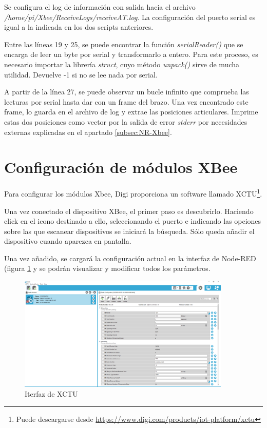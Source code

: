 Se configura el log de información con salida hacia el archivo \textit{/home/pi/Xbee/ReceiveLogs/receiveAT.log}. La configuración del puerto serial es igual a la indicada en los dos scripts anteriores.

Entre las líneas 19 y 25, se puede encontrar la función \textit{serialReader()} que se encarga de leer un byte por serial y transformarlo a entero. Para este proceso, es necesario importar la librería \textit{struct}, cuyo método \textit{unpack()} sirve de mucha utilidad. Devuelve -1 si no se lee nada por serial.

A partir de la línea 27, se puede observar un bucle infinito que comprueba las lecturas por serial hasta dar con un frame del brazo. Una vez encontrado este frame, lo guarda en el archivo de log y extrae las posiciones articulares. Imprime estas dos posiciones como vector por la salida de error \textit{stderr} por necesidades externas explicadas en el apartado \ref{subsec:NR-Xbee}.

\section{Configuración de módulos XBee}\label{subsubsec:xctu}

Para configurar los módulos Xbee, Digi proporciona un software llamado XCTU\footnote{Puede descargarse desde \url{https://www.digi.com/products/iot-platform/xctu}}. 

Una vez conectado el dispositivo XBee, el primer paso es descubrirlo. Haciendo click en el icono destinado a ello, seleccionando el puerto e indicando las opciones sobre las que escanear dispositivos se iniciará la búsqueda. Sólo queda añadir el dispositivo cuando aparezca en pantalla.

Una vez añadido, se cargará la configuración actual en la interfaz de Node-RED (figura \ref{fig:XCTU} y  se podrán visualizar y modificar todos los parámetros.

\begin{figure}[tb]
\centering
\includegraphics[width=0.9\textwidth, frame]{figuras/interfazXCTU.png}
\caption{Iterfaz de XCTU}
\label{fig:XCTU}
\end{figure}

